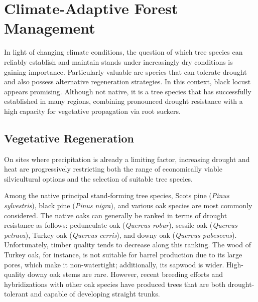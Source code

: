 \section{Climate-Adaptive Forest Management}


In light of changing climate conditions, the question of which tree species can reliably establish and maintain stands under increasingly dry conditions is gaining importance. Particularly valuable are species that can tolerate drought and also possess alternative regeneration strategies. In this context, black locust appears promising. Although not native, it is a tree species that has successfully established in many regions, combining pronounced drought resistance with a high capacity for vegetative propagation via root suckers.

\subsection{Vegetative Regeneration}

On sites where precipitation is already a limiting factor, increasing drought and heat are progressively restricting both the range of economically viable silvicultural options and the selection of suitable tree species.

Among the native principal stand-forming tree species, Scots pine (\emph{Pinus sylvestris}), black pine (\emph{Pinus nigra}), and various oak species are most commonly considered. The native oaks can generally be ranked in terms of drought resistance as follows: pedunculate oak (\emph{Quercus robur}), sessile oak (\emph{Quercus petraea}), Turkey oak (\emph{Quercus cerris}), and downy oak (\emph{Quercus pubescens}). Unfortunately, timber quality tends to decrease along this ranking. The wood of Turkey oak, for instance, is not suitable for barrel production due to its large pores, which make it non-watertight; additionally, its sapwood is wider. High-quality downy oak stems are rare. However, recent breeding efforts and hybridizations with other oak species have produced trees that are both drought-tolerant and capable of developing straight trunks.

